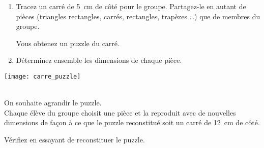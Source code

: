 
\begin{TP}

\begin{minipage}[c]{0.48\linewidth}
\begin{enumerate}
 \item Tracez un carré de 5 cm de côté pour le groupe. Partagez-le en autant de pièces (triangles rectangles, carrés, rectangles, trapèzes \ldots) que de membres du groupe.
 
Vous obtenez un puzzle du carré.
 \item Déterminez ensemble les dimensions de chaque pièce.
 \end{enumerate}
\end{minipage} \hfill%
 \begin{minipage}[c]{0.4\linewidth}
\texttt{[image: carre\_puzzle]}
 \end{minipage} \\

On souhaite agrandir le puzzle. \\[0.5em]
Chaque élève du groupe choisit une pièce et la reproduit avec de nouvelles dimensions de façon à ce que le puzzle reconstitué soit un carré de 12 cm de côté.

Vérifiez en essayant de reconstituer le puzzle.

\end{TP}

